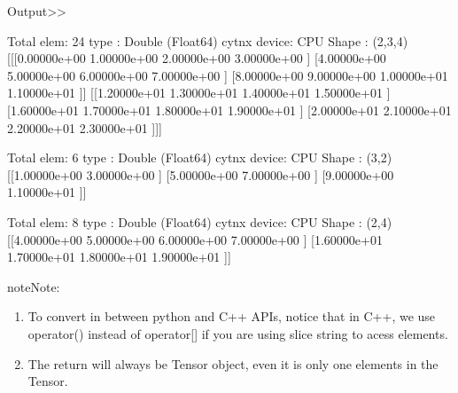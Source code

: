 \documentclass[letterpaper,10pt,english]{sphinxmanual}
\begin{document}
\begin{sphinxVerbatim}[commandchars=\\\{\},numbers=left,firstnumber=1,stepnumber=1]
   
    

   
    

   
    
\end{sphinxVerbatim}

Output\textgreater{}\textgreater{}

\begin{sphinxVerbatim}[commandchars=\\\{\}]
Total elem: 24
type  : Double (Float64)
cytnx device: CPU
Shape : (2,3,4)
[[[0.00000e+00 1.00000e+00 2.00000e+00 3.00000e+00 ]
  [4.00000e+00 5.00000e+00 6.00000e+00 7.00000e+00 ]
  [8.00000e+00 9.00000e+00 1.00000e+01 1.10000e+01 ]]
 [[1.20000e+01 1.30000e+01 1.40000e+01 1.50000e+01 ]
  [1.60000e+01 1.70000e+01 1.80000e+01 1.90000e+01 ]
  [2.00000e+01 2.10000e+01 2.20000e+01 2.30000e+01 ]]]


Total elem: 6
type  : Double (Float64)
cytnx device: CPU
Shape : (3,2)
[[1.00000e+00 3.00000e+00 ]
 [5.00000e+00 7.00000e+00 ]
 [9.00000e+00 1.10000e+01 ]]


Total elem: 8
type  : Double (Float64)
cytnx device: CPU
Shape : (2,4)
[[4.00000e+00 5.00000e+00 6.00000e+00 7.00000e+00 ]
 [1.60000e+01 1.70000e+01 1.80000e+01 1.90000e+01 ]]
\end{sphinxVerbatim}

\begin{sphinxadmonition}{note}{Note:}\begin{enumerate}
%
\item {} 
To convert in between python and C++ APIs, notice that in C++, we use operator() instead of operator{[}{]} if you are using slice string to acess elements.

\item {} 
The return will always be Tensor object, even it is only one elements in the Tensor.

\end{enumerate}
\end{sphinxadmonition}
\end{document}
